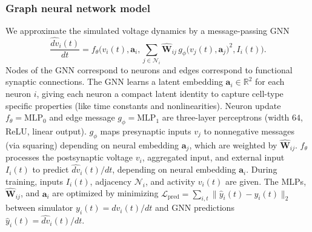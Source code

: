\documentclass[12pt,twocolumn]{article}
\begin{document}
\subsubsection*{Graph neural network model}
We approximate the simulated voltage dynamics by a message-passing GNN \cite{gilmer_neural_2017}
\small%
\begin{equation*}
\frac{\widehat{dv}_i(t)}{dt}
=f_\theta\Big(
v_i(t),\mathbf{a}_i,
\sum_{j\in\mathcal{N}_i} \widehat{\mathbf{W}}_{ij}\,g_\phi\!\big(v_j(t),\mathbf{a}_j\big)^2,
I_i(t)\Big)\mathrm{.}
\label{eq:gnn_ct}
\end{equation*}
\normalsize%
Nodes of the GNN correspond to neurons and edges correspond to functional synaptic connections. The GNN learns a latent embedding $\mathbf{a}_i\in\mathbb{R}^2$ for each neuron $i$, giving each neuron a compact latent identity to capture cell-type specific properties (like time constants and nonlinearities).  Neuron update $f_\theta=\text{MLP}_0$ and edge message $g_\phi=\text{MLP}_1$ are three-layer perceptrons (width $64$, ReLU, linear output). $g_\phi$ maps presynaptic inputs $v_j$ to nonnegative messages (via squaring) depending on neural embedding $\mathbf{a}_j$, which are weighted by $\widehat{\mathbf{W}}_{ij}$. $f_\theta$ processes the postsynaptic voltage $v_i$, aggregated input, and external input $I_i(t)$ to predict $\widehat{dv}_i(t)/d t$, depending on neural embedding $\mathbf{a}_i$. During training, inputs $I_i(t)$, adjacency $\mathcal{N}_i$, and activity $v_i(t)$ are given. The $\mathrm{MLP}$s, $\widehat{\mathbf{W}}_{ij}$, and $\mathbf{a}_i$ 
are optimized by minimizing $\mathcal{L}_{\mathrm{pred}}
= \sum_{i,t}
\|
\widehat{y}_i(t) - y_i(t)
\|_2$ between simulator 
$y_i(t)=dv_i(t)/dt$ and GNN predictions $\widehat{y}_i(t) = \widehat{dv}_i(t)/dt$.
\vspace*{-1.em}
\end{document}

